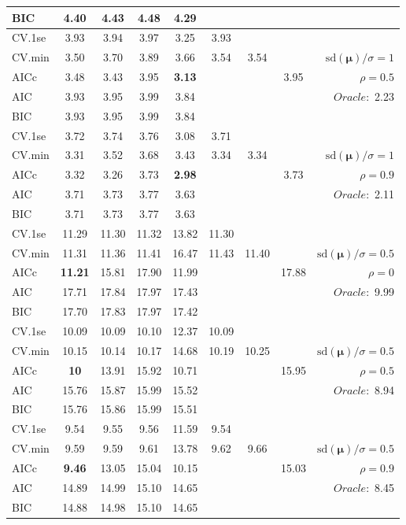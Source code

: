 \begin{table}
\begin{center}
\begin{tabular}{l*{7}{c}|r}
BIC & 4.40 & 4.43 & 4.48 & 4.29 & & & &  \\
 \hline 
CV.1se & 3.93 & 3.94 & 3.97 & 3.25 & 3.93 & & & \\
CV.min & 3.50 & 3.70 & 3.89 & 3.66 & 3.54 & 3.54 & & $\mathrm{sd}(\mathbf{\mu})/\sigma=1$ \\
AICc & 3.48 & 3.43 & 3.95 & {\bf 3.13} & & & 3.95 &  $\rho=0.5$ \\
AIC & 3.93 & 3.95 & 3.99 & 3.84 & & & &  \multirow{2}{*}{$Oracle: $ 2.23} \\
BIC & 3.93 & 3.95 & 3.99 & 3.84 & & & &  \\
 \hline 
CV.1se & 3.72 & 3.74 & 3.76 & 3.08 & 3.71 & & & \\
CV.min & 3.31 & 3.52 & 3.68 & 3.43 & 3.34 & 3.34 & & $\mathrm{sd}(\mathbf{\mu})/\sigma=1$ \\
AICc & 3.32 & 3.26 & 3.73 & {\bf 2.98} & & & 3.73 &  $\rho=0.9$ \\
AIC & 3.71 & 3.73 & 3.77 & 3.63 & & & &  \multirow{2}{*}{$Oracle: $ 2.11} \\
BIC & 3.71 & 3.73 & 3.77 & 3.63 & & & &  \\
 \hline 
CV.1se & 11.29 & 11.30 & 11.32 & 13.82 & 11.30 & & & \\
CV.min & 11.31 & 11.36 & 11.41 & 16.47 & 11.43 & 11.40 & & $\mathrm{sd}(\mathbf{\mu})/\sigma=0.5$ \\
AICc & {\bf 11.21} & 15.81 & 17.90 & 11.99 & & & 17.88 &  $\rho=0$ \\
AIC & 17.71 & 17.84 & 17.97 & 17.43 & & & &  \multirow{2}{*}{$Oracle: $ 9.99} \\
BIC & 17.70 & 17.83 & 17.97 & 17.42 & & & &  \\
 \hline 
CV.1se & 10.09 & 10.09 & 10.10 & 12.37 & 10.09 & & & \\
CV.min & 10.15 & 10.14 & 10.17 & 14.68 & 10.19 & 10.25 & & $\mathrm{sd}(\mathbf{\mu})/\sigma=0.5$ \\
AICc & {\bf 10} & 13.91 & 15.92 & 10.71 & & & 15.95 &  $\rho=0.5$ \\
AIC & 15.76 & 15.87 & 15.99 & 15.52 & & & &  \multirow{2}{*}{$Oracle: $ 8.94} \\
BIC & 15.76 & 15.86 & 15.99 & 15.51 & & & &  \\
 \hline 
CV.1se & 9.54 & 9.55 & 9.56 & 11.59 & 9.54 & & & \\
CV.min & 9.59 & 9.59 & 9.61 & 13.78 & 9.62 & 9.66 & & $\mathrm{sd}(\mathbf{\mu})/\sigma=0.5$ \\
AICc & {\bf 9.46} & 13.05 & 15.04 & 10.15 & & & 15.03 &  $\rho=0.9$ \\
AIC & 14.89 & 14.99 & 15.10 & 14.65 & & & &  \multirow{2}{*}{$Oracle: $ 8.45} \\
BIC & 14.88 & 14.98 & 15.10 & 14.65 & & & &  \\
 \hline 
\end{tabular}
\end{center}
\vspace{-1cm}
\end{table}





